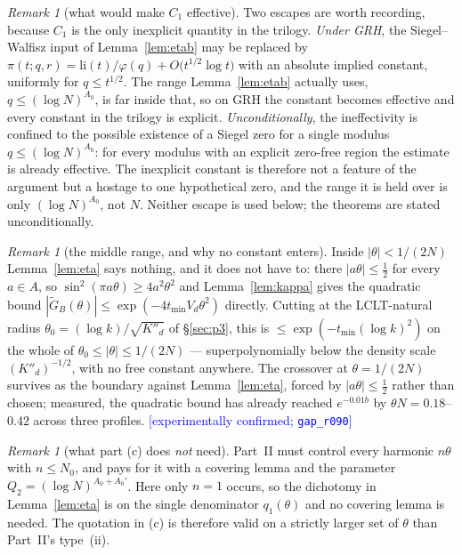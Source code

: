 \documentclass[11pt,a4paper]{article}
\theoremstyle{plain}
\theoremstyle{definition}
\theoremstyle{remark}
\newtheorem{remark}[theorem]{Remark}
\newcommand{\STATUS}[1]{\textcolor{blue}{\textsf{[#1]}}}
\begin{document}
\begin{remark}[what would make $C_1$ effective]\label{rem:grh}
Two escapes are worth recording, because $C_1$ is the only inexplicit quantity in the
trilogy. \emph{Under GRH}, the Siegel--Walfisz input of Lemma~\ref{lem:etab} may be replaced
by $\pi(t;q,r)=\mathrm{li}(t)/\varphi(q)+O\bigl(t^{1/2}\log t\bigr)$ with an absolute implied
constant, uniformly for $q\le t^{1/2}$. The range Lemma~\ref{lem:etab} actually uses,
$q\le(\log N)^{A_0}$, is far inside that, so on GRH the constant becomes effective and every
constant in the trilogy is explicit. \emph{Unconditionally}, the ineffectivity is confined to
the possible existence of a Siegel zero for a single modulus $q\le(\log N)^{A_0}$: for every
modulus with an explicit zero-free region the estimate is already effective. The inexplicit
constant is therefore not a feature of the argument but a hostage to one hypothetical zero,
and the range it is held over is only $(\log N)^{A_0}$, not $N$. Neither escape is used
below; the theorems are stated unconditionally.
\end{remark}

\begin{remark}[the middle range, and why no constant enters]\label{rem:principal}
Inside $|\theta|<1/(2N)$ Lemma~\ref{lem:eta} says nothing, and it does not have to: there
$|a\theta|\le\tfrac12$ for every $a\in A$, so $\sin^{2}(\pi a\theta)\ge4a^{2}\theta^{2}$ and
Lemma~\ref{lem:kappa} gives the quadratic bound
$|\widetilde G_{B}(\theta)|\le\exp(-4t_{\min}V_d\theta^{2})$ directly. Cutting at the
LCLT-natural radius $\theta_0=(\log k)/\sqrt{K''_d}$ of \S\ref{sec:p3}, this is
$\le\exp(-t_{\min}(\log k)^{2})$ on the whole of $\theta_0\le|\theta|\le1/(2N)$ ---
superpolynomially below the density scale $(K''_d)^{-1/2}$, with no free constant anywhere.
The crossover at $\theta=1/(2N)$ survives as the boundary against
Lemma~\ref{lem:eta}, forced by $|a\theta|\le\tfrac12$ rather than chosen; measured, the
quadratic bound has already reached $e^{-0.01b}$ by $\theta N=0.18$--$0.42$ across three
profiles. \STATUS{experimentally confirmed; \texttt{gap\_r090}}
\end{remark}

\begin{remark}[what part (c) does \emph{not} need]\label{rem:nocover}
Part~II must control every harmonic $n\theta$ with $n\le N_0$, and pays for it with a covering
lemma and the parameter $Q_2=(\log N)^{A_0+A_0'}$. Here only $n=1$ occurs, so the dichotomy in
Lemma~\ref{lem:eta} is on the single denominator $q_1(\theta)$ and no covering lemma is needed.
The quotation in (c) is therefore valid on a strictly larger set of $\theta$ than Part~II's
type~(ii).
\end{remark}
\end{document}
